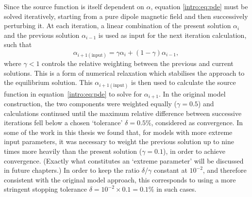Since the source function is itself dependent on $\alpha$, equation \ref{intro:eq:pde} must be solved iteratively, starting from a pure dipole magnetic field and then successively perturbing it. At each iteration, a linear combination of the present solution $\alpha_i$ and the previous solution $\alpha_{i-1}$ is used as input for the next iteration calculation, such that
\begin{equation}\label{intro:eq:convergence}
\alpha_{i+1\mathrm{(input)}} = \gamma\alpha_i + (1-\gamma)\alpha_{i-1},
\end{equation}
where $\gamma<1$ controls the relative weighting between the previous and current solutions. This is a form of numerical relaxation which stabilises the approach to the equilibrium solution. This $\alpha_{i+1(\mathrm{input})}$ is then used to calculate the source function in equation~\ref{intro:eq:pde} to solve for $\alpha_{i+1}$. In the original model construction, the two components were weighted equally ($\gamma=0.5$) and calculations continued until the maximum relative difference between successive iterations fell below a chosen `tolerance' $\delta = 0.5\%$, considered as convergence. In some of the work in this thesis we found that, for models with more extreme input parameters, it was necessary to weight the previous solution up to nine times more heavily than the present solution ($\gamma=0.1$), in order to achieve convergence. (Exactly what constitutes an `extreme parameter' will be discussed in future chapters.) In order to keep the ratio $\delta/\gamma$ constant at $10^{-2}$, and therefore consistent with the original model approach, this corresponds to using a more stringent stopping tolerance $\delta = 10^{-2}\times0.1 = 0.1\%$ in such cases.

